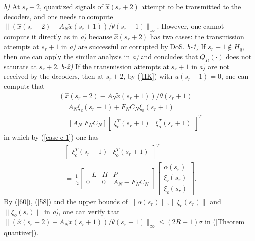 \documentclass[letterpaper,journal,final,twocolumn]{IEEEtran}
\begin{document}
\emph{b)} At $s_r + 2$, quantized signals of $\hat x(s_r + 2)$ attempt to be transmitted to the decoders, and one needs to compute 
$\|
(\hat x(s_r + 2) - A_N \tilde  x(s_r+1))/\theta (s_r+1) \|_\infty . 
$
However, one cannot compute it directly as in \emph{a)} because $\hat x(s_r + 2)$ has two cases: the transmission attempts at $s_r+1$ in \emph{a)} are successful or corrupted by DoS. 
\emph{b-1)} If $s_r + 1 \notin H_q$, then one can apply the similar analysis in \emph{a)} and concludes that $Q_R(\cdot)$ does not saturate at $s_r + 2  $.
\emph{b-2)} If the transmission attempts at $s_r + 1$ in \emph{a)} are not received by the decoders, then at $s_r + 2 $, by (\ref{HK}) with $u(s_r + 1)=0$, one can compute that 
\begin{align}\label{60}
& (\hat x(s_r + 2) - A_N \tilde x(s_r+1))/\theta (s_r+1) \nonumber\\
& = A_N \xi_c (s_r + 1) + F_NC_N \xi_o(s_r + 1) \nonumber\\
& =   \left[A_N \,\, F_N C_N \right] 
\left[
\begin{array}{ll}
\xi_c ^T(s_r+1) &
\xi_ o ^T (s_r+1 )
\end{array}
\right]^T
\end{align} 
in which by (\ref{case c 1}) one has 
\begin{align}\label{58}
&\left[
\begin{array}{ll}
\xi_c ^T(s_r+1) &
\xi_ o ^T (s_r+1 )
\end{array}
\right]^T \nonumber\\
& = 
\frac{1}{\gamma_2}\left[ \begin{array}{ccc}
-L &H& P \\
0 & 0& A_N -F_NC_N 
\end{array}
\right] 
\left[
\begin{array}{l}
\alpha(s_r)\\
\xi_c (s_r ) \\
\xi_ o  (s_r ) 
\end{array}
\right].
\end{align}
By (\ref{60}), (\ref{58}) and the upper bounds of $\|\alpha(s_r)\|, \|\xi_c(s_r)\|$ and $\|\xi_o(s_r)\|$ in \emph{a)}, one can verify that $\| (\hat x(s_r + 2) - A_N \tilde x(s_r+1))/\theta (s_r+1)\|_\infty \le (2R+1)\sigma$ in (\ref{Theorem quantizer}). 
\end{document}
